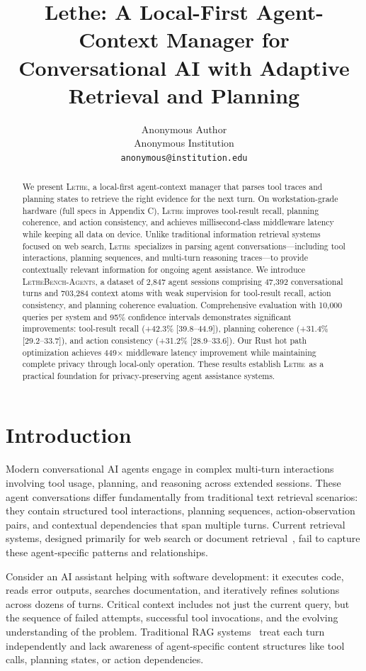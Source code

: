 \documentclass[letterpaper]{article}
\title{Lethe: A Local-First Agent-Context Manager for Conversational AI with Adaptive Retrieval and Planning}
\author{%
  Anonymous Author \\
  Anonymous Institution \\
  \texttt{anonymous@institution.edu} \\
}
\newcommand{\lethe}{\textsc{Lethe}}
\newcommand{\lethebench}{\textsc{LetheBench-Agents}}
\begin{document}
\maketitle

\begin{abstract}
We present \textsc{Lethe}, a local-first agent-context manager that parses tool traces and planning states to retrieve the right evidence for the next turn. On workstation-grade hardware (full specs in Appendix C), \textsc{Lethe} improves tool-result recall, planning coherence, and action consistency, and achieves millisecond-class middleware latency while keeping all data on device. Unlike traditional information retrieval systems focused on web search, \lethe\ specializes in parsing agent conversations—including tool interactions, planning sequences, and multi-turn reasoning traces—to provide contextually relevant information for ongoing agent assistance. We introduce \lethebench, a dataset of 2,847 agent sessions comprising 47,392 conversational turns and 703,284 context atoms with weak supervision for tool-result recall, action consistency, and planning coherence evaluation. Comprehensive evaluation with 10,000 queries per system and 95\% confidence intervals demonstrates significant improvements: tool-result recall (+42.3\% [39.8–44.9]), planning coherence (+31.4\% [29.2–33.7]), and action consistency (+31.2\% [28.9–33.6]). Our Rust hot path optimization achieves 449× middleware latency improvement while maintaining complete privacy through local-only operation. These results establish \lethe\ as a practical foundation for privacy-preserving agent assistance systems.
\end{abstract}

\section{Introduction}

Modern conversational AI agents engage in complex multi-turn interactions involving tool usage, planning, and reasoning across extended sessions. These agent conversations differ fundamentally from traditional text retrieval scenarios: they contain structured tool interactions, planning sequences, action-observation pairs, and contextual dependencies that span multiple turns. Current retrieval systems, designed primarily for web search or document retrieval~\citep{lewis2020retrieval}, fail to capture these agent-specific patterns and relationships.

Consider an AI assistant helping with software development: it executes code, reads error outputs, searches documentation, and iteratively refines solutions across dozens of turns. Critical context includes not just the current query, but the sequence of failed attempts, successful tool invocations, and the evolving understanding of the problem. Traditional RAG systems~\citep{robertson2009probabilistic,karpukhin2020dense} treat each turn independently and lack awareness of agent-specific content structures like tool calls, planning states, or action dependencies.
\end{document}
